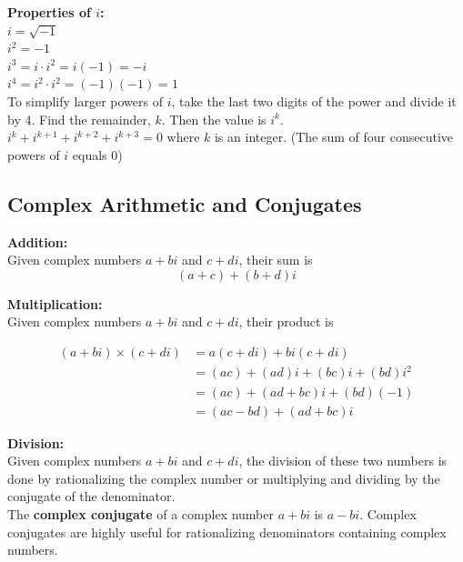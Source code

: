 \documentclass{article}
\begin{document}
            \noindent \textbf{Properties of $i$:} \\
            $i=\sqrt{-1}$ \\
            $i^2=-1$ \\
            $i^3=i\cdot i^2=i(-1)=-i$ \\
            $i^4=i^2\cdot i^2=(-1)(-1)=1$ \\
            To simplify larger powers of $i$, take the last two digits of the power and divide it by
            4. Find the remainder, $k$. Then the value is $i^k$. \\
            $i^k+i^{k+1}+i^{k+2}+i^{k+3}=0$ where $k$ is an integer. (The sum of four consecutive
            powers of $i$ equals 0)


        \subsection{Complex Arithmetic and Conjugates}
            \textbf{Addition:} \\
            Given complex numbers $a+bi$ and $c+di$, their sum is \\
            \begin{equation*}
                (a+c) + (b+d)i
            \end{equation*}

            \noindent \textbf{Multiplication:} \\
            Given complex numbers $a+bi$ and $c+di$, their product is

            \begin{align*}
                (a+bi) \times (c+di) &= a(c+di)+bi(c+di) \\
                &= (ac) + (ad)i + (bc)i + (bd)i^2 \\
                &= (ac) + (ad+bc)i + (bd)(-1) \\
                &= (ac-bd) + (ad+bc)i
            \end{align*}

            \noindent \textbf{Division:} \\
            Given complex numbers $a+bi$ and $c+di$, the division of these two numbers is done by
            rationalizing the complex number or multiplying and dividing by the conjugate of the
            denominator. \\

            \noindent The \textbf{complex conjugate} of a complex number $a+bi$ is $a-bi$.
            Complex conjugates are highly useful for rationalizing denominators containing complex
            numbers. \\
\end{document}
